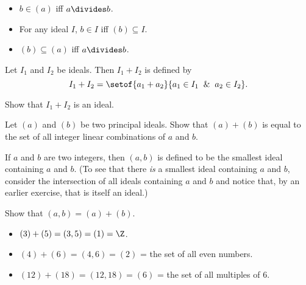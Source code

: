 \documentclass[oneside,12pt]{amsart}
\begin{document}
\begin{homework}
\quad
\begin{itemize}
\item $b\in (a)$ iff $a\divides b$.
\item For any ideal $I$, $b\in I$ iff $(b) \subseteq I$.
\item $(b)\subseteq (a)$ iff $a \divides b$.
\end{itemize}
\end{homework}

\begin{definition}
Let $I_1$ and $I_2$ be ideals. Then $I_1+I_2$ is defined by
$$I_1+I_2 = \setof{a_1+a_2}{a_1\in I_1\And a_2 \in I_2}.$$
\end{definition}

\begin{homework}
Show that $I_1 + I_2$ is an ideal.
\end{homework}

\begin{homework}
Let $(a)$ and $(b)$ be two principal ideals.
Show that $(a)+(b)$ is equal to the set of
all integer linear combinations of $a$ and $b$.
\end{homework}

\begin{definition}
If $a$ and $b$ are two integers, then $(a,b)$ is defined to be the smallest
ideal containing $a$ and $b$. (To see that there \emph{is} a smallest
ideal containing $a$ and $b$, consider the intersection of all ideals containing
$a$ and $b$ and notice that, by an earlier exercise, that is itself an ideal.)
\end{definition}

\begin{homework}
Show that $(a,b) = (a) + (b)$.
\end{homework}

\begin{in_class_example}
\quad
\begin{itemize}
\item $(3) + (5) = (3,5) = (1) = \Z$.

\item $(4) + (6) = (4,6) = (2)$ = the set of all even numbers.

\item $(12) + (18) = (12,18) = (6)$ = the set of all multiples of 6.
\end{itemize}
\end{in_class_example}
\end{document}
